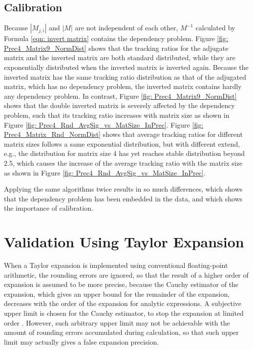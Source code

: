 \documentclass[twoside]{article}
\numberwithin{equation}{section}
\begin{document}
\subsection{Calibration}
\label{sec: calibration}

Because \textbf{$|M_{j,i}|$} and \textbf{$|M|$} are not independent of each other, \textbf{$M^{-1}$} calculated by Formula \eqref{eqn: invert matrix} contains the dependency problem. Figure \ref{fig: Prec4_Matrix9_NormDist} shows that the tracking ratios for the adjugate matrix and the inverted matrix are both standard distributed, while they are exponentially distributed when the inverted matrix is inverted again.  Because the inverted matrix has the same tracking ratio distribution as that of the adjugated matrix, which has no dependency problem, the inverted matrix contains hardly any dependency problem.  In contrast, Figure \ref{fig: Prec4_Matrix9_NormDist} shows that the double inverted matrix is severely affected by the dependency problem, such that its tracking ratio increases with matrix size as shown in Figure \ref{fig: Prec4_Rnd_AvgSig_vs_MatSize_InPrec}.  Figure \ref{fig: Prec4_Matrix_Rnd_NormDist} shows that average tracking ratios for different matrix sizes follows a same exponential distribution, but with different extend, e.g., the distribution for matrix size 4 has yet reaches stable distribution beyond 2.5, which causes the increase of the average tracking ratio with the matrix size as shown in Figure \ref{fig: Prec4_Rnd_AvgSig_vs_MatSize_InPrec}.

Applying the same algorithms twice results in so much differences, which shows that the dependency problem has been embedded in the data, and which shows the importance of calibration.



\clearpage
\section{Validation Using Taylor Expansion}
\label{sec: taylor expansion}

When a Taylor expansion is implemented using conventional floating-point arithmetic, the rounding errors are ignored, so that the result of a higher order of expansion is assumed to be more precise, because the Cauchy estimator of the expansion, which gives an upper bound for the remainder of the expansion, decreases with the order of the expansion for analytic expressions.  A subjective upper limit is chosen for the Cauchy estimator, to stop the expansion at limited order \cite{Numerical_Recipes}.  However, such arbitrary upper limit may not be achievable with the amount of rounding errors accumulated during calculation, so that such upper limit may actually gives a false expansion precision.   
\end{document}
